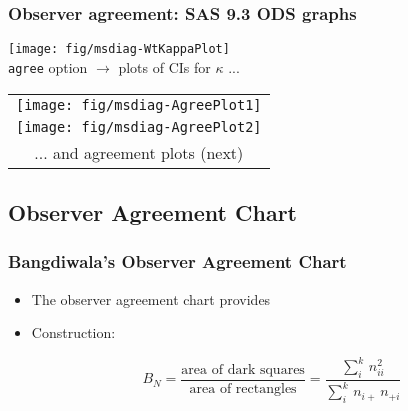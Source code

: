 \begin{frame}
 \frametitle{Observer agreement: SAS 9.3 ODS graphs}
 \begin{minipage}[c]{.5\linewidth}
  \centering
  \texttt{[image: fig/msdiag-WtKappaPlot]}
    \\ \texttt{agree} option $\rightarrow$ plots of CIs for $\kappa$ ... 
 \end{minipage}%
 \begin{minipage}[c]{.5\linewidth}
  \centering
  \begin{tabular}{c}
  \texttt{[image: fig/msdiag-AgreePlot1]} \\
  \texttt{[image: fig/msdiag-AgreePlot2]} \\
   ... and agreement plots (next)
  \end{tabular}
 \end{minipage}
\end{frame}



\subsection{Observer Agreement Chart}
\begin{frame}
  \frametitle{Bangdiwala's Observer Agreement Chart}
  \begin{itemize}
	\item The observer agreement chart \cite{Bangdiwala:87} provides
	 

	\item Construction: 
  \begin{equation*}
  B_N  =
  \frac{ \mbox{area of dark squares}}
  { \mbox{area of rectangles}}  =
  \frac{ \sum_i^k \,  n_{ii}^2 }
  { \sum_i^k \,  n_{i+} \,  n_{+i} }
  \end{equation*}
  \end{itemize}
\end{frame}

